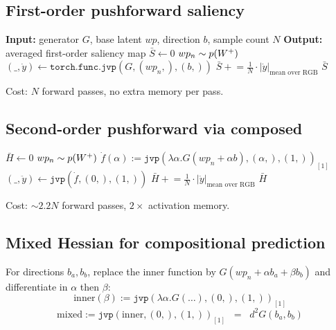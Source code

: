 
\subsection{First-order pushforward saliency}
\begin{algorithmic}
\STATE \textbf{Input:} generator $G$, base latent $wp$, direction $b$, sample count $N$
\STATE \textbf{Output:} averaged first-order saliency map
\STATE
\STATE $\bar S \leftarrow 0$
  \STATE $wp_n \sim p(W^+)$
  \STATE $(\_, \dot y) \leftarrow \texttt{torch.func.jvp}(G, (wp_n,), (b,))$
  \STATE $\bar S \mathrel{+}= \tfrac{1}{N} \cdot |\dot y|_{\text{mean over RGB}}$
\ENDFOR
\RETURN $\bar S$
\end{algorithmic}

Cost: $N$ forward passes, no extra memory per pass.

\subsection{Second-order pushforward via composed \jvp}
\begin{algorithmic}
\STATE $\bar H \leftarrow 0$
  \STATE $wp_n \sim p(W^+)$
  \STATE $\dot f(\alpha) := \texttt{jvp}(\lambda\alpha. G(wp_n + \alpha b), (\alpha,), (1,))_{[1]}$
  \STATE $(\_, \ddot y) \leftarrow \texttt{jvp}(\dot f, (0,), (1,))$
  \STATE $\bar H \mathrel{+}= \tfrac{1}{N} \cdot |\ddot y|_{\text{mean over RGB}}$
\ENDFOR
\RETURN $\bar H$
\end{algorithmic}

Cost: $\sim 2.2 N$ forward passes, $2\times$ activation memory.

\subsection{Mixed Hessian for compositional prediction}
For directions $b_a, b_b$, replace the inner function by
$G(wp_n + \alpha b_a + \beta b_b)$ and differentiate in $\alpha$ then
$\beta$:
\begin{equation*}
  \mathrm{inner}(\beta) := \texttt{jvp}(\lambda \alpha. G(\ldots), (0,), (1,))_{[1]}
\end{equation*}
\begin{equation*}
  \mathrm{mixed} := \texttt{jvp}(\mathrm{inner}, (0,), (1,))_{[1]} \;\;=\;\; d^2 G(b_a, b_b)
\end{equation*}

